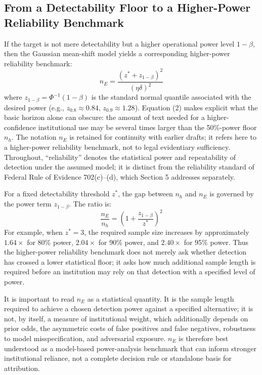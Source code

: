 \documentclass[11pt]{article}
\begin{document}
\subsection{From a Detectability Floor to a Higher-Power Reliability Benchmark}

If the target is not mere detectability but a higher operational power level
$1-\beta$, then the Gaussian mean-shift model yields a corresponding higher-power
reliability benchmark:
\begin{equation}
n_E = \frac{(z^* + z_{1-\beta})^2}{(\eta\delta)^2}
\end{equation}
where $z_{1-\beta} = \Phi^{-1}(1-\beta)$ is the standard normal quantile associated
with the desired power (e.g., $z_{0.8} \approx 0.84$, $z_{0.9} \approx 1.28$).
Equation (2) makes explicit what the basic horizon alone can obscure: the amount of
text needed for a higher-confidence institutional use may be several times larger
than the 50\%-power floor $n_h$. The notation $n_E$ is retained for continuity with
earlier drafts; it refers here to a higher-power reliability benchmark, not to legal
evidentiary sufficiency. Throughout, ``reliability'' denotes the statistical power
and repeatability of detection under the assumed model; it is distinct from the
reliability standard of Federal Rule of Evidence 702(c)--(d), which Section 5
addresses separately.

For a fixed detectability threshold $z^*$, the gap between $n_h$ and $n_E$ is
governed by the power term $z_{1-\beta}$. The ratio is:
\begin{equation}
\frac{n_E}{n_h} = \left(1 + \frac{z_{1-\beta}}{z^*}\right)^2
\end{equation}
For example, when $z^* = 3$, the required sample size increases by approximately
$1.64\times$ for 80\% power, $2.04\times$ for 90\% power, and $2.40\times$ for 95\%
power. Thus the higher-power reliability benchmark does not merely ask whether
detection has crossed a lower statistical floor; it asks how much additional sample
length is required before an institution may rely on that detection with a
specified level of power.

It is important to read $n_E$ as a statistical quantity. It is the sample length
required to achieve a chosen detection power against a specified alternative; it is
not, by itself, a measure of institutional weight, which additionally depends on
prior odds, the asymmetric costs of false positives and false negatives, robustness
to model misspecification, and adversarial exposure. $n_E$ is therefore best
understood as a model-based power-analysis benchmark that can inform stronger
institutional reliance, not a complete decision rule or standalone basis for
attribution.
\end{document}
